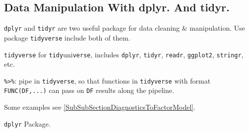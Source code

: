 \subsection{Data Manipulation With dplyr. And tidyr.}
    \lstinline|dplyr| and \lstinline|tidyr| are two useful package for data cleaning \& manipulation. Use package \lstinline|tidyverse| include both of them.

    \lstinline|tidyverse| for \lstinline|tidy|uni\lstinline|verse|, includes \lstinline|dplyr|, \lstinline|tidyr|, \lstinline|readr|, \lstinline|ggplot2|, \lstinline|stringr|, etc.

\begin{point}
    \lstinline|%>%|: pipe in \lstinline|tidyverse|, so that functions in \lstinline|tidyverse| with format \lstinline|FUNC(DF,...)| can pass on \lstinline|DF| results along the pipeline.
\end{point}

Some examples see \autoref{SubSubSectionDiagnosticsToFactorModel}.


\begin{point}
    \lstinline|dplyr| Package. 
\end{point}

